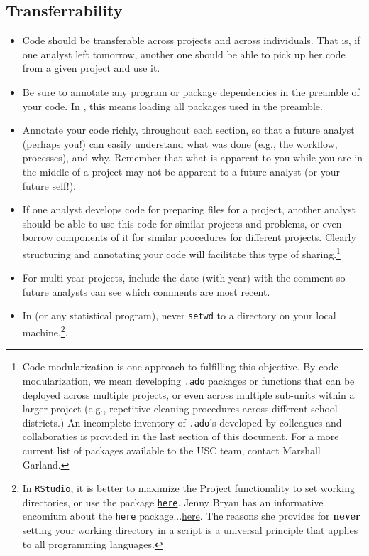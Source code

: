 \documentclass[11pt]{article}
\begin{document}
\subsection{Transferrability}
\begin{itemize}
	\item Code should be transferable across projects and across individuals. That is, if one analyst left tomorrow, another one should be able to pick up her code from a given project and use it.
	\item Be sure to annotate any program or package dependencies in the preamble of your code. In \faRProject, this means loading all packages used in the preamble.
	\item Annotate your code richly, throughout each section, so that a future analyst (perhaps you!) can easily understand what was done (e.g., the workflow, processes), and why. Remember that what is apparent to you while you are in the middle of a project may not be apparent to a future analyst (or your future self!).
	\item If one analyst develops code for preparing files for a project, another analyst should be able to use this code for similar projects and problems, or even borrow components of it for similar procedures for different projects. Clearly structuring and annotating your code will facilitate this type of sharing.\footnote{Code modularization is one approach to fulfilling this objective. By code modularization, we mean developing \texttt{.ado} packages or \faRProject functions that can be deployed across multiple projects, or even across multiple sub-units within a larger project (e.g., repetitive cleaning procedures across different school districts.) An incomplete inventory of \texttt{.ado}'s developed by colleagues and collaboraties is provided in the last section of this document. For a more current list of packages available to the USC team, contact Marshall Garland.}
	\item For multi-year projects, include the date (with year) with the comment so future analysts can see which comments are most recent.
	\item In \faRProject (or any statistical program), never \texttt{setwd} to a directory on your local machine.\footnote{In \texttt{RStudio}, it is better to maximize the Project functionality to set working directories, or use the package \href{https://here.r-lib.org/}{\texttt{here}}. Jenny Bryan has an informative encomium about the \texttt{here} package...\href{https://github.com/jennybc/here_here}{here}. The reasons she provides for \textbf{never} setting your working directory in a script is a universal principle that applies to all programming languages.}.
\end{itemize}
\end{document}
